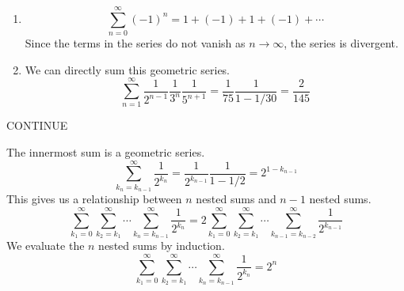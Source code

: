 {\begin{Solution}
\begin{enumerate}
\begin{gather*}
      \boxed{
        \sum_{n = 1}^\infty \frac{1}{n^2 + n} = 1
        }
    \end{gather*}
  \item 
    \[
    \sum_{n = 0}^\infty (-1)^n = 1 + (-1) + 1 + (-1) + \cdots
    \]
    Since the terms in the series do not vanish as $n \to \infty$, the series 
    is divergent.
  \item 
    We can directly sum this geometric series.
    \[
    \boxed{
      \sum_{n = 1}^\infty \frac{1}{2^{n-1}} \frac{1}{3^n} \frac{1}{5^{n+1}}
      = \frac{1}{75} \frac{1}{1 - 1/30} = \frac{2}{145}
      }
    \]
  \end{enumerate}
  CONTINUE
\end{Solution}


\begin{Solution}
  \label{solution sum sum 1/2 k}
  The innermost sum is a geometric series.
  \[
  \sum_{k_n = k_{n-1}}^\infty \frac{1}{2^{k_n}} 
  = \frac{1}{2^{k_{n-1}}} \frac{1}{1 - 1/2}
  = 2^{1 - k_{n-1}}
  \]
  This gives us a relationship between $n$ nested sums and $n-1$ nested sums.
  \[
  \sum_{k_1 = 0}^\infty \sum_{k_2 = k_1}^\infty \cdots \sum_{k_n = k_{n-1}}^\infty \frac{1}{2^{k_n}}
  = 2 \sum_{k_1 = 0}^\infty \sum_{k_2 = k_1}^\infty \cdots \sum_{k_{n-1} = k_{n-2}}^\infty \frac{1}{2^{k_{n-1}}}
  \]
  We evaluate the $n$ nested sums by induction.
  \[
  \boxed{
    \sum_{k_1 = 0}^\infty \sum_{k_2 = k_1}^\infty \cdots \sum_{k_n = k_{n-1}}^\infty \frac{1}{2^{k_n}} = 2^n
    }
  \]
\end{Solution}






}

